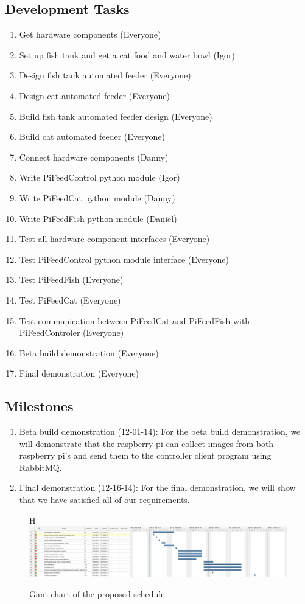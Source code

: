 \subsection{Development Tasks}
\begin{enumerate}
    \item Get hardware components (Everyone)
    \item Set up fish tank and get a cat food and water bowl (Igor)
    \item Design fish tank automated feeder (Everyone)
    \item Design cat automated feeder (Everyone)
    \item Build fish tank automated feeder design (Everyone)
    \item Build cat automated feeder (Everyone)
    \item Connect hardware components (Danny)
    \item Write PiFeedControl python module (Igor)
    \item Write PiFeedCat python module (Danny)
    \item Write PiFeedFish python module (Daniel)
    \item Test all hardware component interfaces (Everyone)
    \item Test PiFeedControl python module interface (Everyone)
    \item Test PiFeedFish (Everyone)
    \item Test PiFeedCat (Everyone)
    \item Test communication between PiFeedCat and PiFeedFish with
          PiFeedControler (Everyone)
    \item Beta build demonstration (Everyone)
    \item Final demonstration (Everyone)

\end{enumerate}

\subsection{Milestones}
\begin{enumerate}
    \item Beta build demonstration (12-01-14): For the beta build demonstration,
    we will demonstrate that the raspberry pi can collect images from both
    raspberry pi's and send them to the controller client program using
    RabbitMQ.
    \item Final demonstration (12-16-14): For the final demonstration, we will
    show that we have satisfied all of our requirements.
\end{enumerate}

\begin{figure}{H}
    \centering
    \captionsetup{justification=centering, margin = 0.5cm}
    \includegraphics[scale=0.3]{images/Gant} 
    \caption{Gant chart of the proposed schedule.}
    \label{fig:gant}
\end{figure}



